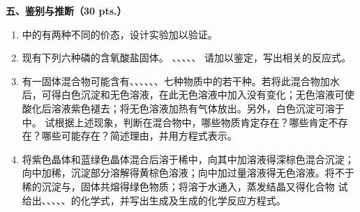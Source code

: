 \vspace{0.5cm}
\noindent\textbf{五、鉴别与推断（30 pts.）}

\begin{enumerate}[label=\arabic*., start=1, itemsep=1.5ex]
    \item {}中的有两种不同的价态，设计实验加以验证。
    \item 现有下列六种磷的含氧酸盐固体。
    、、、、、
    请加以鉴定，写出相关的反应式。
    \item 有一固体混合物可能含有、、、、、、七种物质中的若干种。若将此混合物加水后，可得白色沉淀和无色溶液，在此无色溶液中加入没有变化；无色溶液可使酸化后溶液紫色褪去；将无色溶液加热有气体放出。另外，白色沉淀可溶于中。
    试根据上述现象，判断在混合物中，哪些物质肯定存在？哪些肯定不存在？哪些可能存在？简述理由，并用方程式表示。
    \item 将紫色晶体和蓝绿色晶体混合后溶于稀中，向其中加溶液得深棕色混合沉淀；向中加稀，沉淀部分溶解得黄棕色溶液；向中加过量溶液得无色溶液。将不于稀的沉淀与，固体共熔得绿色物质；将溶于水通入，蒸发结晶又得化合物
    试给出、、、、、的化学式，并写出生成及生成的化学反应方程式。
\end{enumerate}